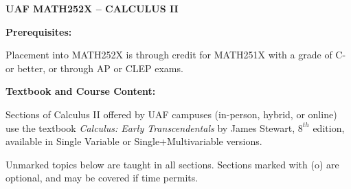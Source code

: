 \documentclass[12 pt]{article}
\begin{document}
	\begin{center}
\textbf{UAF MATH252X -- CALCULUS II}
	\end{center}

\noindent
{\bf Prerequisites:}

Placement into MATH252X is through credit for  MATH251X with a grade of C- or better, or through AP or CLEP exams.
						
\bigskip




\noindent
{\bf Textbook and Course Content:}

Sections of Calculus II offered by UAF campuses (in-person, hybrid, or online) use the textbook \emph{Calculus: Early Transcendentals} by James Stewart, $8^{th}$ edition, available in Single Variable or Single+Multivariable versions.  

Unmarked topics below are taught in all sections. Sections marked with (o) are optional, and may be covered if time permits. 
		
		
		
\end{document}
